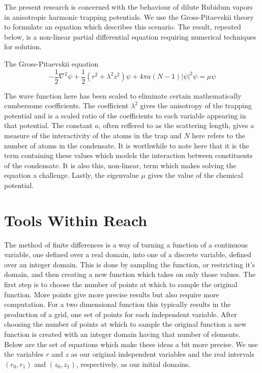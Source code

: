 \documentclass{article}
\begin{document}
The present research is concerned with the behaviour of dilute Rubidum vapors
in anisotropic harmonic trapping potentials. We use the Gross-Pitaevskii theory to formulate
an equation which describes this scenario. The result, repeated below, is a
non-linear partial differential equation requiring numerical techniques for solution.

The Gross-Pitaevskii equation
\begin{equation}
- \frac{1}{2}  \nabla^{2} \psi +
\frac{1}{2} \left( r^{2} + \lambda^{2} z^{2} \right) \psi +
4 \pi a (N-1) \lvert \psi \rvert^{2} \psi = 
\mu \psi
\end{equation}

The wave function here has been scaled to eliminate certain mathematically cumbersome
coefficients. The coefficient $\lambda^{2}$ gives the anisotropy of the trapping potential
and is a scaled ratio of the coefficients to each variable appearing in that
potential. The constant $a$, often
reffered to as the scattering length, gives a measure of the interactivity of the atoms
in the trap and $N$ here refers to the number of atoms in the condensate. It is worthwhile
to note here that it is the term containing these values which models the interaction
between constituents of the condensate. It is also this, non-linear, term which makes
solving the equation a challenge. Lastly, the eigenvalue
$\mu$ gives the value of the chemical potential.
\section{Tools Within Reach}

The method of finite differences is a way of turning a function of a continuous
variable, one defined over a real domain, into one of a discrete
variable, defined over an integer domain. This
is done by sampling the function, or restricting it's domain, and then creating
a new function which takes on only those values.
The first step is to choose the number of points at which to
sample the original function. More points give more precise results but also require
more computation. For a two dimensional function this typically
results in the production of a grid, one set of points for each independent
variable. After choosing the number of points at which to sample the original
function a new function is created with an integer domain having that number of
elements. Below are the set of equations which make these ideas a bit more
precise. We use the variables $r$ and $z$ as our original independent
variables and the real intervals $(r_{0}, r_{1})$ and $(z_{0}, z_{1})$,
respectively, as our initial domains.
\end{document}
